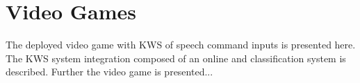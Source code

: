 
\chapter{Video Games}\label{sec:game}
The deployed video game with KWS of speech command inputs is presented here.
The KWS system integration composed of an online and classification system is described.
Further the video game is presented...



